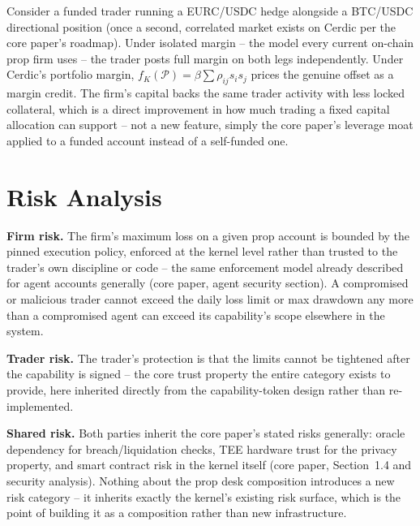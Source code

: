 \documentclass[11pt,a4paper]{article}
\begin{document}
Consider a funded trader running a EURC/USDC hedge alongside a BTC/USDC directional
position (once a second, correlated market exists on Cerdic per the core paper's roadmap).
Under isolated margin -- the model every current on-chain prop firm uses -- the trader posts
full margin on both legs independently. Under Cerdic's portfolio margin,
$f_K(\mathcal{P}) = \beta \sum \rho_{ij} s_i s_j$ prices the genuine offset as a margin
credit. The firm's capital backs the same trader activity with less locked collateral,
which is a direct improvement in how much trading a fixed capital allocation can support --
not a new feature, simply the core paper's leverage moat applied to a funded account instead
of a self-funded one.

\section{Risk Analysis}
\label{sec:risk}

\textbf{Firm risk.} The firm's maximum loss on a given prop account is bounded by the
pinned execution policy, enforced at the kernel level rather than trusted to the trader's
own discipline or code -- the same enforcement model already described for agent accounts
generally (core paper, agent security section). A compromised or malicious trader cannot
exceed the daily loss limit or max drawdown any more than a compromised agent can exceed its
capability's scope elsewhere in the system.

\textbf{Trader risk.} The trader's protection is that the limits cannot be tightened after
the capability is signed -- the core trust property the entire category exists to provide,
here inherited directly from the capability-token design rather than re-implemented.

\textbf{Shared risk.} Both parties inherit the core paper's stated risks generally: oracle
dependency for breach/liquidation checks, TEE hardware trust for the privacy property, and
smart contract risk in the kernel itself (core paper, Section~1.4 and security analysis).
Nothing about the prop desk composition introduces a new risk category -- it inherits
exactly the kernel's existing risk surface, which is the point of building it as a
composition rather than new infrastructure.

\end{document}
